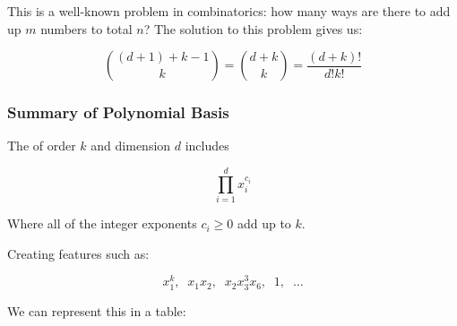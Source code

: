                 This is a well-known problem in combinatorics: how many ways are there to add up $m$ numbers to total $n$? The solution to this problem gives us:

                \begin{equation}
                    \binom{(d+1)+k-1}{k} = \binom{d+k}{k} = \frac{(d+k)!}{d!k!}
                \end{equation}

            \subsecdiv
            \subsubsection{Summary of Polynomial Basis}

                \phantom{}

                \begin{definition}
                    The  of order $k$ and dimension $d$ includes 

                    \begin{equation}
                        \prod_{i=1}^d x_i^{c_i}
                    \end{equation}

                    Where all of the integer exponents $c_i\geq 0$ add up to  $k$.

                    Creating features such as:

                    \begin{equation}
                        x_1^k, \;\; x_1x_2, \;\; x_2x_3^3x_6, \;\; 1, \;\; \dots
                    \end{equation}
                \end{definition}

                We can represent this in a table:

